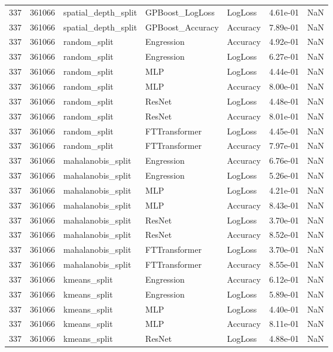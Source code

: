 \begin{tabular}{rrlllrr}
337 & 361066 & spatial\_depth\_split & GPBoost\_LogLoss & LogLoss & 4.61e-01 & NaN \\
337 & 361066 & spatial\_depth\_split & GPBoost\_Accuracy & Accuracy & 7.89e-01 & NaN \\
337 & 361066 & random\_split & Engression & Accuracy & 4.92e-01 & NaN \\
337 & 361066 & random\_split & Engression & LogLoss & 6.27e-01 & NaN \\
337 & 361066 & random\_split & MLP & LogLoss & 4.44e-01 & NaN \\
337 & 361066 & random\_split & MLP & Accuracy & 8.00e-01 & NaN \\
337 & 361066 & random\_split & ResNet & LogLoss & 4.48e-01 & NaN \\
337 & 361066 & random\_split & ResNet & Accuracy & 8.01e-01 & NaN \\
337 & 361066 & random\_split & FTTransformer & LogLoss & 4.45e-01 & NaN \\
337 & 361066 & random\_split & FTTransformer & Accuracy & 7.97e-01 & NaN \\
337 & 361066 & mahalanobis\_split & Engression & Accuracy & 6.76e-01 & NaN \\
337 & 361066 & mahalanobis\_split & Engression & LogLoss & 5.26e-01 & NaN \\
337 & 361066 & mahalanobis\_split & MLP & LogLoss & 4.21e-01 & NaN \\
337 & 361066 & mahalanobis\_split & MLP & Accuracy & 8.43e-01 & NaN \\
337 & 361066 & mahalanobis\_split & ResNet & LogLoss & 3.70e-01 & NaN \\
337 & 361066 & mahalanobis\_split & ResNet & Accuracy & 8.52e-01 & NaN \\
337 & 361066 & mahalanobis\_split & FTTransformer & LogLoss & 3.70e-01 & NaN \\
337 & 361066 & mahalanobis\_split & FTTransformer & Accuracy & 8.55e-01 & NaN \\
337 & 361066 & kmeans\_split & Engression & Accuracy & 6.12e-01 & NaN \\
337 & 361066 & kmeans\_split & Engression & LogLoss & 5.89e-01 & NaN \\
337 & 361066 & kmeans\_split & MLP & LogLoss & 4.40e-01 & NaN \\
337 & 361066 & kmeans\_split & MLP & Accuracy & 8.11e-01 & NaN \\
337 & 361066 & kmeans\_split & ResNet & LogLoss & 4.88e-01 & NaN \\

\end{tabular}
